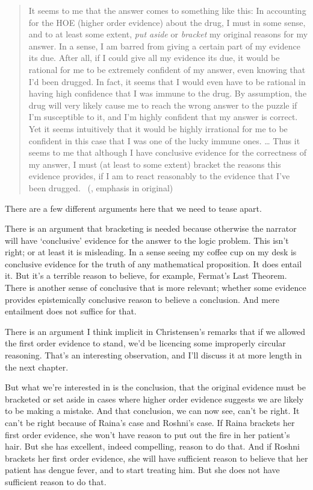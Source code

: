 \documentclass[
  10pt,
  letterpaper,
  twoside]{scrbook}
\begin{document}
\begin{quote}
It seems to me that the answer comes to something like this: In
accounting for the HOE (higher order evidence) about the drug, I must in
some sense, and to at least some extent, \emph{put aside} or
\emph{bracket} my original reasons for my answer. In a sense, I am
barred from giving a certain part of my evidence its due. After all, if
I could give all my evidence its due, it would be rational for me to be
extremely conﬁdent of my answer, even knowing that I'd been drugged. In
fact, it seems that I would even have to be rational in having high
confidence that I was immune to the drug. By assumption, the drug will
very likely cause me to reach the wrong answer to the puzzle if I'm
susceptible to it, and I'm highly conﬁdent that my answer is correct.
Yet it seems intuitively that it would be highly irrational for me to be
conﬁdent in this case that I was one of the lucky immune ones. \ldots{}
Thus it seems to me that although I have conclusive evidence for the
correctness of my answer, I must (at least to some extent) bracket the
reasons this evidence provides, if I am to react reasonably to the
evidence that I've been drugged.
~(, emphasis
in original)
\end{quote}

There are a few different arguments here that we need to tease apart.

There is an argument that bracketing is needed because otherwise the
narrator will have `conclusive' evidence for the answer to the logic
problem. This isn't right; or at least it is misleading. In a sense
seeing my coffee cup on my desk is conclusive evidence for the truth of
any mathematical proposition. It does entail it. But it's a terrible
reason to believe, for example, Fermat's Last Theorem. There is another
sense of conclusive that is more relevant; whether some evidence
provides epistemically conclusive reason to believe a conclusion. And
mere entailment does not suffice for that.

There is an argument I think implicit in Christensen's remarks that if
we allowed the first order evidence to stand, we'd be licencing some
improperly circular reasoning. That's an interesting observation, and
I'll discuss it at more length in the next chapter.

But what we're interested in is the conclusion, that the original
evidence must be bracketed or set aside in cases where higher order
evidence suggests we are likely to be making a mistake. And that
conclusion, we can now see, can't be right. It can't be right because of
Raina's case and {Roshni}'s case. If Raina brackets her first order
evidence, she won't have reason to put out the fire in her patient's
hair. But she has excellent, indeed compelling, reason to do that. And
if {Roshni} brackets her first order evidence, she will have sufficient
reason to believe that her patient has dengue fever, and to start
treating him. But she does not have sufficient reason to do that.
\end{document}
